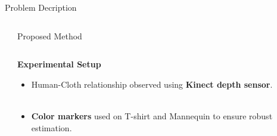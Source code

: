 \documentclass[final,hyperref={pdfpagelabels=false}]{beamer}
\begin{document}
\begin{frame}[t]
\begin{columns}[t]
\begin{column}{0.47\linewidth}
\begin{block}{Problem Decription}
\begin{columns}[t]
\begin{column}{0.5\linewidth}
\end{column}

\end{columns}

\end{block}

\end{column}

\begin{column}{.02\linewidth}\end{column}

\end{columns}

\begin{columns}[t]

\begin{column}{0.02\linewidth}\end{column}

\begin{column}{0.96\linewidth}

\begin{alertblock}{Proposed Method}

\begin{columns}[t]

\begin{column}{0.24\linewidth}

\centering \textbf{Experimental Setup}

\begin{itemize}
\item Human-Cloth relationship observed using \textbf{Kinect depth sensor}.\\~\\
\item \textbf{Color markers} used on T-shirt and Mannequin to ensure robust estimation.
\end{itemize}

\vspace{6mm}


\end{column}
\end{columns}
\end{alertblock}
\end{column}
\end{columns}
\end{frame}
\end{document}
